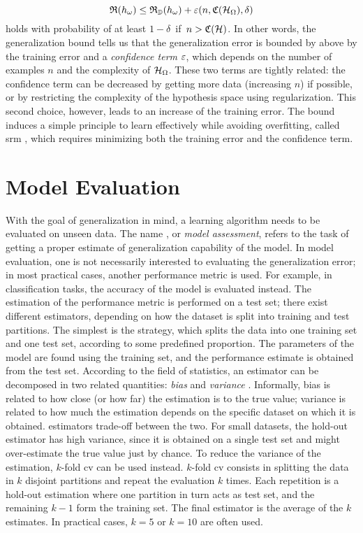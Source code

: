 $$\Risk(h_{\omega}) \leq \Risk_{\Data}(h_{\omega}) + \eps(n, \Complexity(\HypSpace), \delta)$$
holds with probability of at least $1 - \delta\,$ if $\,n > \Complexity(\Cal{H})$. In other words, the generalization bound tells us that the generalization error is bounded by above by the training error and a \emph{confidence term} $\varepsilon$, which depends on the number of examples $n$ and the complexity of $\HypSpace$. These two terms are tightly related: the confidence term can be decreased by getting more data (increasing $n$) if possible, or by restricting the complexity of the hypothesis space using regularization. This second choice, however, leads to an increase of the training error. The bound induces a simple principle to learn effectively while avoiding overfitting, called \gls{srm} \citep{vapnik2000slt}, which requires minimizing both the training error and the confidence term.

\section{Model Evaluation}\label{sec:model-selection}
With the goal of generalization in mind, a learning algorithm needs to be evaluated on unseen data. The name , or \emph{model assessment}, refers to the task of getting a proper estimate of generalization capability of the model. In model evaluation, one is not necessarily interested to evaluating the generalization error; in most practical cases, another performance metric is used. For example, in classification tasks, the accuracy of the model is evaluated instead. The estimation of the performance metric is performed on a test set; there exist different estimators, depending on how the dataset is split into training and test partitions. The simplest is the  strategy, which splits the data into one training set and one test set, according to some predefined proportion. The parameters of the model are found using the training set, and the performance estimate is obtained from the test set. According to the field of statistics, an estimator can be decomposed in two related quantities: \emph{bias} and \emph{variance} \citep{hastie2009elements}. Informally, bias is related to how close (or how far) the estimation is to the true value; variance is related to how much the estimation depends on the specific dataset on which it is obtained.  estimators trade-off between the two. For small datasets, the hold-out estimator has high variance, since it is obtained on a single test set and might over-estimate the true value just by chance. To reduce the variance of the estimation, $k$-fold \gls{cv} \citep{arlot2010cv} can be used instead. $k$-fold \gls{cv} consists in splitting the data in $k$ disjoint partitions and repeat the evaluation $k$ times. Each repetition is a hold-out estimation where one partition in turn acts as test set, and the remaining $k-1$ form the training set. The final estimator is the average of the $k$ estimates. In practical cases, $k=5$ or $k=10$ are often used.

